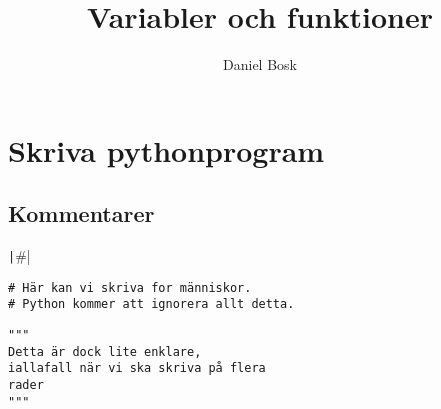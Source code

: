 \title{%
  Variabler och funktioner
}
\author{Daniel Bosk}


\mode*

\begin{abstract}
  
\end{abstract}


\section{Skriva pythonprogram}

\subsection{Kommentarer}

\begin{frame}[fragile]
  \begin{center}
    \texttt|#|
  \end{center}
\end{frame}

\begin{frame}[fragile]
  \begin{example}
    \begin{verbatim}
# Här kan vi skriva for människor.
# Python kommer att ignorera allt detta.
    \end{verbatim}
  \end{example}
\end{frame}

\begin{frame}[fragile]
  \begin{example}
    \begin{verbatim}
"""
Detta är dock lite enklare,
iallafall när vi ska skriva på flera
rader
"""
    \end{verbatim}
  \end{example}
\end{frame}


